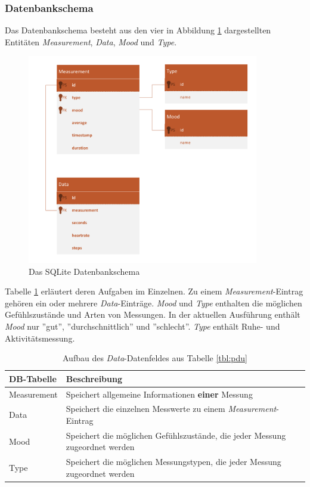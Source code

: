\subsubsection{Datenbankschema}
Das Datenbankschema besteht aus den vier in Abbildung \ref{pic:database-scheme} dargestellten Entitäten \textit{Measurement}, \textit{Data}, \textit{Mood} und \textit{Type}. 
\begin{figure}[H]
	\centering
	\includegraphics[width=0.9\textwidth]{images/database-schema.pdf}
	\caption{Das SQLite Datenbankschema}
	\label{pic:database-scheme}
\end{figure}

Tabelle \ref{tbl:database-entities} erläutert deren Aufgaben im Einzelnen. Zu einem \textit{Measurement}-Eintrag gehören ein oder mehrere \textit{Data}-Einträge. \textit{Mood} und \textit{Type} enthalten die möglichen Gefühlszustände und Arten von Messungen. In der aktuellen Ausführung enthält \textit{Mood} nur ''gut'', ''durchschnittlich'' und ''schlecht''. \textit{Type} enthält Ruhe- und Aktivitätsmessung.  
\begin{table}[h]
	\centering
		\begin{tabularx}{\textwidth}{l|X}
			\hline
			DB-Tabelle & Beschreibung \\
			\hline
			\hline
			Measurement & Speichert allgemeine Informationen \textbf{einer} Messung\\
			\hline
			Data & Speichert die einzelnen Messwerte zu einem \textit{Measurement}-Eintrag\\
			\hline
			Mood & Speichert die möglichen Gefühlszustände, die jeder Messung zugeordnet werden\\
			\hline
			Type & Speichert die möglichen Messungstypen, die jeder Messung zugeordnet werden\\
			\hline
		\end{tabularx}
		\caption{Aufbau des \textit{Data}-Datenfeldes aus Tabelle \ref{tbl:pdu}}
		\label{tbl:database-entities}
\end{table}

